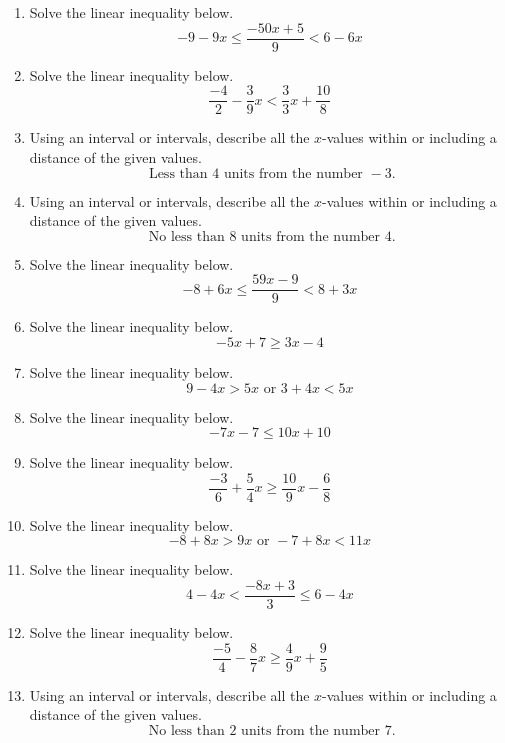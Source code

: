 \documentclass[14pt]{extbook}
\begin{document}
\begin{enumerate}
\item{
Solve the linear inequality below.\[ -9 - 9 x \leq \frac{-50 x + 5}{9} < 6 - 6 x \]} \newpage
\item{
Solve the linear inequality below.\[ \frac{-4}{2} - \frac{3}{9} x < \frac{3}{3} x + \frac{10}{8} \]} \newpage
\item{
Using an interval or intervals, describe all the $x$-values within or including a distance of the given values.\[ \text{ Less than } 4 \text{ units from the number } -3. \]} \newpage
\item{
Using an interval or intervals, describe all the $x$-values within or including a distance of the given values.\[ \text{ No less than } 8 \text{ units from the number } 4. \]} \newpage
\item{
Solve the linear inequality below.\[ -8 + 6 x \leq \frac{59 x - 9}{9} < 8 + 3 x \]} \newpage
\item{
Solve the linear inequality below.\[ -5x + 7 \geq 3x -4 \]} \newpage
\item{
Solve the linear inequality below.\[ 9 - 4 x > 5 x \text{ or } 3 + 4 x < 5 x \]} \newpage
\item{
Solve the linear inequality below.\[ -7x -7 \leq 10x + 10 \]} \newpage
\item{
Solve the linear inequality below.\[ \frac{-3}{6} + \frac{5}{4} x \geq \frac{10}{9} x - \frac{6}{8} \]} \newpage
\item{
Solve the linear inequality below.\[ -8 + 8 x > 9 x \text{ or } -7 + 8 x < 11 x \]} \newpage
\item{
Solve the linear inequality below.\[ 4 - 4 x < \frac{-8 x + 3}{3} \leq 6 - 4 x \]} \newpage
\item{
Solve the linear inequality below.\[ \frac{-5}{4} - \frac{8}{7} x \geq \frac{4}{9} x + \frac{9}{5} \]} \newpage
\item{
Using an interval or intervals, describe all the $x$-values within or including a distance of the given values.\[ \text{ No less than } 2 \text{ units from the number } 7. \]} \newpage
\end{enumerate}
\end{document}
